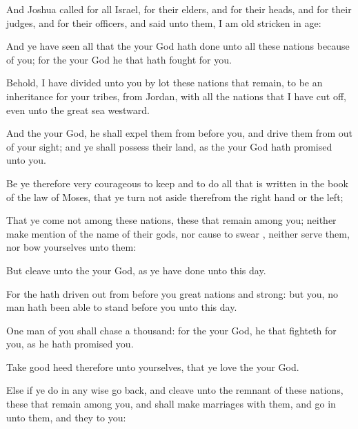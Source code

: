 {And
Joshua
called for all
Israel,
{} for their
elders, and for their
heads, and for their
judges, and for their
officers, and
said unto them, I am
old
{}
stricken in
age:

And ye have
seen all that the
{} your
God hath
done unto all these
nations
because of you; for the
{} your
God
{} he that hath
fought for you.

Behold, I have
divided unto you by lot these
nations that
remain, to be an
inheritance for your
tribes, from
Jordan, with all the
nations that I have cut
off, even unto the
great
sea
westward.

And the
{} your
God, he shall
expel them from
before you, and
drive them from out of your
sight; and ye shall
possess their
land, as the
{} your
God hath
promised unto you.

Be ye therefore
very
courageous to
keep and to
do all that is
written in the
book of the
law of
Moses, that ye
turn not aside therefrom
{} the right
hand or
{} the
left;

That ye
come not among these
nations, these that
remain among you; neither make
mention of the
name of their
gods, nor cause to
swear
{}, neither
serve them, nor
bow yourselves unto them:

But
cleave unto the
{} your
God, as ye have
done unto this
day.

For the
{} hath driven
out from
before you
great
nations and
strong: but
{} you, no
man hath been able to
stand
before you unto this
day.

One
man of you shall
chase a
thousand: for the
{} your
God, he
{} that
fighteth for you, as he hath
promised you.


\par }{\PP {}Take
good
heed therefore unto
yourselves, that ye
love the
{} your
God.

Else if ye do in any
wise go
back, and
cleave unto the
remnant of these
nations,
{} these that
remain among you, and shall make
marriages with them, and go
in unto them, and they to you:

}
